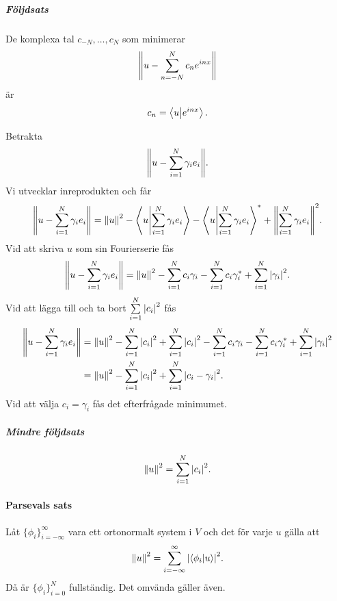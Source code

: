 \proof

\subparagraph{Följdsats}
De komplexa tal $c_{-N}, \dots, c_{N}$ som minimerar
\begin{align*}
	\norm{u - \sum\limits_{n = -N}^{N}c_{n}e^{inx}}
\end{align*}
är
\begin{align*}
	c_{n} = \bra{u}\ket{e^{inx}}.
\end{align*}

\proof
Betrakta
\begin{align*}
	\norm{u - \sum\limits_{i = 1}^{N}\gamma_{i}e_{i}}.
\end{align*}
Vi utvecklar inreprodukten och får
\begin{align*}
	\norm{u - \sum\limits_{i = 1}^{N}\gamma_{i}e_{i}} = \norm{u}^{2} - \bra{u}\ket{\sum\limits_{i = 1}^{N}\gamma_{i}e_{i}} - \bra{u}\ket{\sum\limits_{i = 1}^{N}\gamma_{i}e_{i}}^{*} + \norm{\sum\limits_{i = 1}^{N}\gamma_{i}e_{i}}^{2}.
\end{align*}
Vid att skriva $u$ som sin Fourierserie fås
\begin{align*}
	\norm{u - \sum\limits_{i = 1}^{N}\gamma_{i}e_{i}} = \norm{u}^{2} - \sum\limits_{i = 1}^{N}c_{i}\gamma_{i} - \sum\limits_{i = 1}^{N}c_{i}\gamma_{i}^{*} + \sum\limits_{i = 1}^{N}\abs{\gamma_{i}}^{2}.
\end{align*}
Vid att lägga till och ta bort $\sum\limits_{i = 1}^{N}\abs{c_{i}}^{2}$ fås
\begin{align*}
	\norm{u - \sum\limits_{i = 1}^{N}\gamma_{i}e_{i}} &= \norm{u}^{2} - \sum\limits_{i = 1}^{N}\abs{c_{i}}^{2} + \sum\limits_{i = 1}^{N}\abs{c_{i}}^{2} - \sum\limits_{i = 1}^{N}c_{i}\gamma_{i} - \sum\limits_{i = 1}^{N}c_{i}\gamma_{i}^{*} + \sum\limits_{i = 1}^{N}\abs{\gamma_{i}}^{2} \\
	                                                 &= \norm{u}^{2} - \sum\limits_{i = 1}^{N}\abs{c_{i}}^{2} + \sum\limits_{i = 1}^{N}\abs{c_{i} - \gamma_{i}}^{2}.
\end{align*}
Vid att välja $c_{i} = \gamma_{i}$ fås det efterfrågade minimumet.

\subparagraph{Mindre följdsats}
\begin{align*}
	\norm{u}^{2} = \sum\limits_{i = 1}^{N}\abs{c_{i}}^{2}.
\end{align*}

\paragraph{Parsevals sats}
Låt $\{\phi_{i}\}_{i = -\infty}^{\infty}$ vara ett ortonormalt system i $V$ och det för varje $u$ gälla att
\begin{align*}
	\norm{u}^{2} = \sum\limits_{i = -\infty}^{\infty}\abs{\bra{\phi_{i}}\ket{u}}^{2}.
\end{align*}
Då är $\{\phi_{i}\}_{i = 0}^{N}$ fullständig. Det omvända gäller även.

